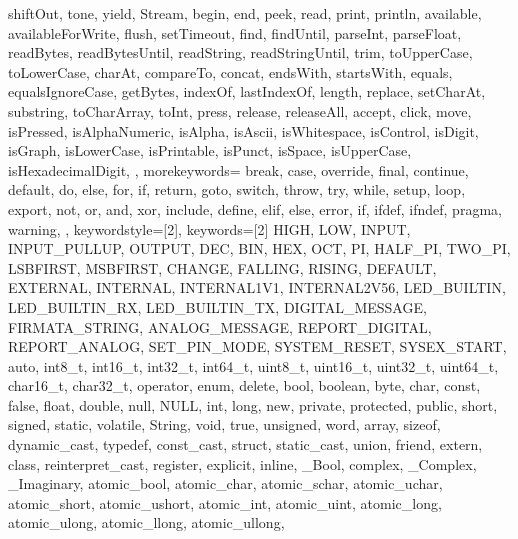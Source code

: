 {{                 shiftOut, tone, yield, Stream, begin, end, peek, read, print, 
                 println, available, availableForWrite, flush, setTimeout, find, 
                 findUntil, parseInt, parseFloat, readBytes, readBytesUntil, readString, 
                 readStringUntil, trim, toUpperCase, toLowerCase, charAt, compareTo, 
                 concat, endsWith, startsWith, equals, equalsIgnoreCase, getBytes, 
                 indexOf, lastIndexOf, length, replace, setCharAt, substring, 
                 toCharArray, toInt, press, release, releaseAll, accept, click, move, 
                 isPressed, isAlphaNumeric, isAlpha, isAscii, isWhitespace, isControl, 
                 isDigit, isGraph, isLowerCase, isPrintable, isPunct, isSpace, 
                 isUpperCase, isHexadecimalDigit, 
                 }, 
   morekeywords={   %
                 break, case, override, final, continue, default, do, else, for, 
                 if, return, goto, switch, throw, try, while, setup, loop, export, 
                 not, or, and, xor, include, define, elif, else, error, if, ifdef, 
                 ifndef, pragma, warning,
                 }, 
   keywordstyle=[2]\color{arduinoBlue},   
   keywords=[2]{   %
                 HIGH, LOW, INPUT, INPUT_PULLUP, OUTPUT, DEC, BIN, HEX, OCT, PI, 
                 HALF_PI, TWO_PI, LSBFIRST, MSBFIRST, CHANGE, FALLING, RISING, 
                 DEFAULT, EXTERNAL, INTERNAL, INTERNAL1V1, INTERNAL2V56, LED_BUILTIN, 
                 LED_BUILTIN_RX, LED_BUILTIN_TX, DIGITAL_MESSAGE, FIRMATA_STRING, 
                 ANALOG_MESSAGE, REPORT_DIGITAL, REPORT_ANALOG, SET_PIN_MODE, 
                 SYSTEM_RESET, SYSEX_START, auto, int8_t, int16_t, int32_t, int64_t, 
                 uint8_t, uint16_t, uint32_t, uint64_t, char16_t, char32_t, operator, 
                 enum, delete, bool, boolean, byte, char, const, false, float, double, 
                 null, NULL, int, long, new, private, protected, public, short, 
                 signed, static, volatile, String, void, true, unsigned, word, array, 
                 sizeof, dynamic_cast, typedef, const_cast, struct, static_cast, union, 
                 friend, extern, class, reinterpret_cast, register, explicit, inline, 
                 _Bool, complex, _Complex, _Imaginary, atomic_bool, atomic_char, 
                 atomic_schar, atomic_uchar, atomic_short, atomic_ushort, atomic_int, 
                 atomic_uint, atomic_long, atomic_ulong, atomic_llong, atomic_ullong, 
}}
